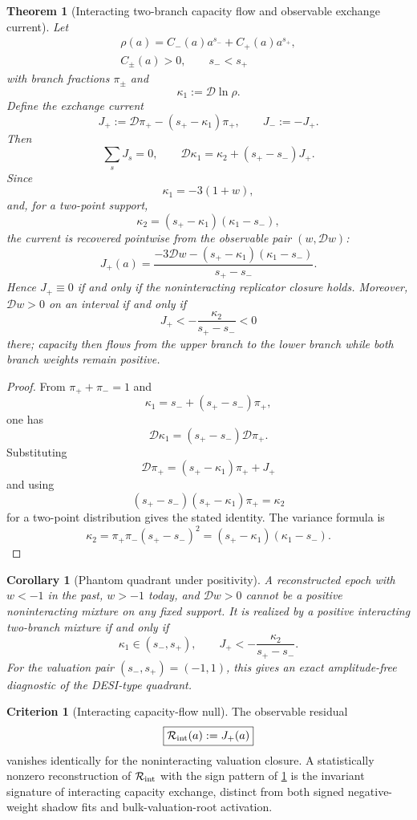 \documentclass[aps,prd,reprint,nofootinbib,superscriptaddress]{revtex4-2}
\numberwithin{equation}{section}
\theoremstyle{definition}
\newtheorem{criterion}{Criterion}[section]
\theoremstyle{plain}
\newtheorem{theorem}{Theorem}[section]
\newtheorem{corollary}{Corollary}[section]
\newcommand{\Dil}{\mathscr D}
\begin{document}
\begin{theorem}[Interacting two-branch capacity flow and observable exchange current]
\label{thm:interacting-current}
Let
\[
\begin{gathered}
\rho(a)=C_-(a)a^{s_-}+C_+(a)a^{s_+},\\
C_\pm(a)>0,\qquad s_-<s_+
\end{gathered}
\]
with branch fractions \(\pi_\pm\) and
\[
\kappa_1:=\Dil\ln\rho .
\]
Define the exchange current
\[
J_+:=\Dil\pi_+-(s_+-\kappa_1)\pi_+,
\qquad
J_-:=-J_+ .
\]
Then
\[
\sum_sJ_s=0,
\qquad
\Dil\kappa_1=\kappa_2+(s_+-s_-)J_+ .
\]
Since
\[
\kappa_1=-3(1+w),
\]
and, for a two-point support,
\[
\kappa_2=(s_+-\kappa_1)(\kappa_1-s_-),
\]
the current is recovered pointwise from the observable pair \((w,\Dil w)\):
\begin{equation}
\boxed{
J_+(a)=
\frac{
-3\Dil w-(s_+-\kappa_1)(\kappa_1-s_-)
}{
s_+-s_-
}.
}
\label{eq:observable-current}
\end{equation}
Hence \(J_+\equiv0\) if and only if the noninteracting replicator closure holds.  Moreover, \(\Dil w>0\) on an interval if and only if
\[
J_+<-\frac{\kappa_2}{s_+-s_-}<0
\]
there; capacity then flows from the upper branch to the lower branch while both branch weights remain positive.
\end{theorem}

\begin{proof}
From \(\pi_++\pi_-=1\) and
\[
\kappa_1=s_-+(s_+-s_-)\pi_+,
\]
one has
\[
\Dil\kappa_1=(s_+-s_-)\Dil\pi_+ .
\]
Substituting
\[
\Dil\pi_+=(s_+-\kappa_1)\pi_++J_+
\]
and using
\[
(s_+-s_-)(s_+-\kappa_1)\pi_+=\kappa_2
\]
for a two-point distribution gives the stated identity.  The variance formula is
\[
\kappa_2=\pi_+\pi_-(s_+-s_-)^2
=(s_+-\kappa_1)(\kappa_1-s_-).
\]
\end{proof}

\begin{corollary}[Phantom quadrant under positivity]
A reconstructed epoch with \(w<-1\) in the past, \(w>-1\) today, and \(\Dil w>0\) cannot be a positive noninteracting mixture on any fixed support.  It is realized by a positive interacting two-branch mixture if and only if
\[
\kappa_1\in(s_-,s_+),
\qquad
J_+<-\frac{\kappa_2}{s_+-s_-}.
\]
For the valuation pair \((s_-,s_+)=(-1,1)\), this gives an exact amplitude-free diagnostic of the DESI-type quadrant.
\end{corollary}

\begin{criterion}[Interacting capacity-flow null]
The observable residual
\[
\boxed{\mathcal R_{\rm int}(a):=J_+(a)}
\]
vanishes identically for the noninteracting valuation closure.  A statistically nonzero reconstruction of \(\mathcal R_{\rm int}\) with the sign pattern of \cref{thm:interacting-current} is the invariant signature of interacting capacity exchange, distinct from both signed negative-weight shadow fits and bulk-valuation-root activation.
\end{criterion}
\end{document}
